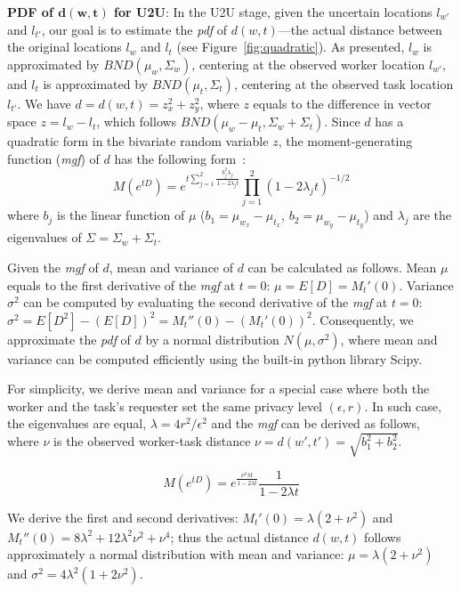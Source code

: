 \documentclass{USC-Thesis}
\numberwithin{equation}{chapter}
\begin{document}
\textbf{PDF of $\mathbf{d(w,t)}$ for U2U}: In the U2U stage, given the uncertain locations $l_{w'}$ and $l_{t'}$, our goal is to estimate the \emph{pdf} of $d(w,t)$---the actual distance between the original locations $l_w$ and $l_t$  (see Figure~\ref{fig:quadratic}). As presented, $l_w$ is approximated by $\mathit{BND(\mu_w,\Sigma_w)}$, centering at the observed worker location $l_{w'}$, and  $l_t$ is approximated by $\mathit{BND(\mu_t,\Sigma_t)}$, centering at the observed task location $l_{t'}$. We have $d=d(w,t)=z_x^2+z_y^2$, where $z$ equals to the difference in vector space $z=l_w-l_t$, which follows $\mathit{BND(\mu_w-\mu_t,\Sigma_w+\Sigma_t)}$. Since $d$ has a quadratic form in the bivariate random variable $z$, the moment-generating function (\emph{mgf}) of $d$ has the following form~\cite{mathai1992quadratic}:
$$M(e^{tD})=e^{t\sum_{j=1}^2\frac{b_j^2\lambda_j}{1-2\lambda_j t}}\prod_{j=1}^2 (1-2\lambda_j t)^{-1/2}$$
where $b_j$ is the linear function of $\mu$ ($\mathit{b_1=\mu_{w_x}-\mu_{t_x}}$, $\mathit{b_2=\mu_{w_y}-\mu_{t_y}}$) and $\lambda_j$ are the eigenvalues of $\Sigma=\Sigma_w+\Sigma_t$.

Given the \emph{mgf} of $d$, mean and variance of $d$ can be calculated as follows.
Mean $\mu$ equals to the first derivative of the \emph{mgf} at $\mathit{t=0}$: $\mathit{\mu=E[D]=M_t'(0)}$. Variance $\sigma^2$ can be computed by evaluating the second derivative of the \emph{mgf} at $\mathit{t=0}$: $\mathit{\sigma^2=E[D^2]-(E[D])^2=M_t''(0)-(M_t'(0))^2}$.
Consequently, we approximate the \emph{pdf} of $d$ by a normal distribution $N(\mu,\sigma^2)$, where
mean and variance can be computed efficiently using the built-in python library Scipy.

For simplicity, we derive mean and variance for a special case where both the worker and the task's requester set the same privacy level $(\epsilon,r)$. In such case, the eigenvalues are equal, $\lambda=4r^2/\epsilon^2$ and the \emph{mgf} can be derived as follows, where $\nu$ is the observed worker-task distance $\nu=d(w',t')=\sqrt{b_1^2+b_2^2}$.

\begin{equation}
M(e^{tD})=e^{\frac{\nu^2\lambda t}{1-2\lambda t}}\frac{1}{1-2\lambda t}
\label{eq:mgf}
\end{equation}

We derive the first and second derivatives: $M_t'(0)=\lambda(2+\nu^2)$ and $M_t''(0)=8\lambda^2+12\lambda^2\nu^2+\nu^4$; thus the actual distance $d(w,t)$ follows approximately a normal distribution with mean and variance: $\mu=\lambda(2+\nu^2)$ and $\sigma^2=4\lambda^2(1+2\nu^2)$.
\end{document}
